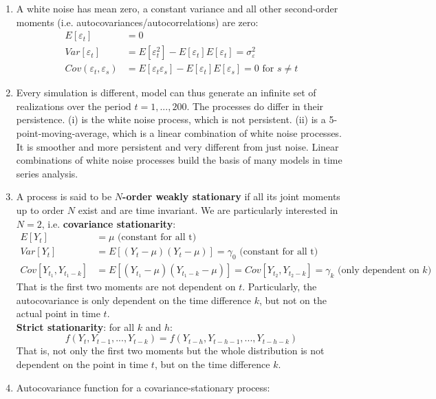 \begin{enumerate}
\item A white noise has mean zero, a constant variance and all other second-order moments (i.e. autocovariances/autocorrelations) are zero:
\begin{align*}
    E[\varepsilon_t]&=0\\
    Var[\varepsilon_t]&=E[\varepsilon_t^2] - E[\varepsilon_t]E[\varepsilon_t] = \sigma_\varepsilon^2\\
    Cov(\varepsilon_{t},\varepsilon_s) &= E[\varepsilon_t \varepsilon_s] - E[\varepsilon_t]E[\varepsilon_s] = 0 \text{ for $s \neq t$}
\end{align*}	
\item 
Every simulation is different, model can thus generate an infinite set of realizations over the period $t=1,...,200$.
The processes do differ in their persistence.
(i) is the white noise process, which is not persistent.
(ii) is a 5-point-moving-average, which is a linear combination of white noise processes.
It is smoother and more persistent and very different from just noise.
Linear combinations of white noise processes build the basis of many models in time series analysis.
\item A process is said to be \textbf{$N$-order weakly stationary} if all its joint moments up to order $N$ exist and are time invariant.
We are particularly interested in $N=2$, i.e. \textbf{covariance stationarity}:
\begin{align*}
E[Y_t]&=\mu \text{ (constant for all t)}
\\
Var[Y_t]&=E[(Y_t - \mu)(Y_t-\mu)]=\gamma_0 \text{ (constant for all t)}
\\
Cov[Y_{t_1},Y_{t_1-k}] &= E[(Y_{t_1}-\mu)(Y_{t_1-k}-\mu)] = Cov[Y_{t_2},Y_{t_2-k}] = \gamma_k  \text{ (only dependent on $k$)}
\end{align*}
That is the first two moments are not dependent on $t$.
Particularly, the autocovariance is only dependent on the time difference $k$, but not on the actual point in time $t$.
\\
\textbf{Strict stationarity}: for all $k$ and $h$: $$f(Y_t,Y_{t-1},...,Y_{t-k})=f(Y_{t-h},Y_{t-h-1},...,Y_{t-h-k})$$
That is, not only the first two moments but the whole distribution is not dependent on the point in time $t$,
  but on the time difference $k$.
\item Autocovariance function for a covariance-stationary process:

\end{enumerate}
